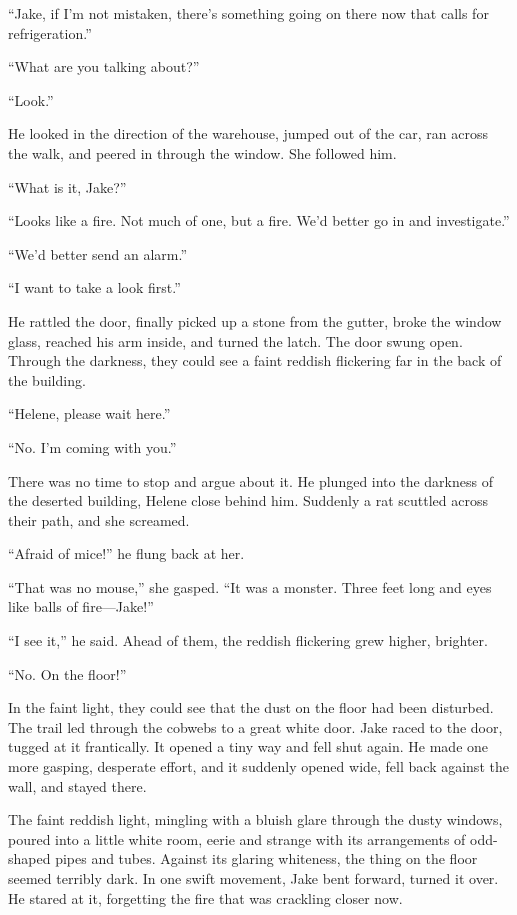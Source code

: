 \documentclass{novel}
\begin{document}
“Jake, if I’m not mistaken, there’s something going on there now that calls for refrigeration.”

“What are you talking about?”

“Look.”

He looked in the direction of the warehouse, jumped out of the car, ran across the walk, and peered in through the window. She followed him.

“What is it, Jake?”

“Looks like a fire. Not much of one, but a fire. We’d better go in and investigate.”

“We’d better send an alarm.”

“I want to take a look first.”

He rattled the door, finally picked up a stone from the gutter, broke the window glass, reached his arm inside, and turned the latch. The door swung open. Through the darkness, they could see a faint reddish flickering far in the back of the building.

“Helene, please wait here.”

“No. I’m coming with you.”

There was no time to stop and argue about it. He plunged into the darkness of the deserted building, Helene close behind him. Suddenly a rat scuttled across their path, and she screamed.

“Afraid of mice!” he flung back at her.

“That was no mouse,” she gasped. “It was a monster. Three feet long and eyes like balls of fire—Jake!”

“I see it,” he said. Ahead of them, the reddish flickering grew higher, brighter.

“No. On the floor!”

In the faint light, they could see that the dust on the floor had been disturbed. The trail led through the cobwebs to a great white door. Jake raced to the door, tugged at it frantically. It opened a tiny way and fell shut again. He made one more gasping, desperate effort, and it suddenly opened wide, fell back against the wall, and stayed there.

The faint reddish light, mingling with a bluish glare through the dusty windows, poured into a little white room, eerie and strange with its arrangements of odd-shaped pipes and tubes. Against its glaring whiteness, the thing on the floor seemed terribly dark. In one swift movement, Jake bent forward, turned it over. He stared at it, forgetting the fire that was crackling closer now.
\end{document}

